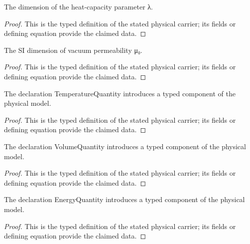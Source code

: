 \begin{definition}
  \label{def:physics:IPhO_2026_3_B_2:aux006}
  The dimension of the heat-capacity parameter λ.
\end{definition}
\begin{proof}
  This is the typed definition of the stated physical carrier; its fields or defining equation provide the claimed data.
\end{proof}

\begin{definition}
  \label{def:physics:IPhO_2026_3_B_2:aux007}
  The SI dimension of vacuum permeability μ₀.
\end{definition}
\begin{proof}
  This is the typed definition of the stated physical carrier; its fields or defining equation provide the claimed data.
\end{proof}

\begin{definition}
  \label{def:physics:IPhO_2026_3_B_2:aux008}
  The declaration TemperatureQuantity introduces a typed component of the physical model.
\end{definition}
\begin{proof}
  This is the typed definition of the stated physical carrier; its fields or defining equation provide the claimed data.
\end{proof}

\begin{definition}
  \label{def:physics:IPhO_2026_3_B_2:aux009}
  The declaration VolumeQuantity introduces a typed component of the physical model.
\end{definition}
\begin{proof}
  This is the typed definition of the stated physical carrier; its fields or defining equation provide the claimed data.
\end{proof}

\begin{definition}
  \label{def:physics:IPhO_2026_3_B_2:aux010}
  The declaration EnergyQuantity introduces a typed component of the physical model.
\end{definition}
\begin{proof}
  This is the typed definition of the stated physical carrier; its fields or defining equation provide the claimed data.
\end{proof}

